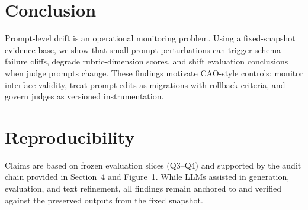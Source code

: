 \documentclass{article}
\begin{document}
\section{Conclusion}
Prompt-level drift is an operational monitoring problem.
Using a fixed-snapshot evidence base, we show that small prompt perturbations can trigger schema failure cliffs, degrade rubric-dimension scores, and shift evaluation conclusions when judge prompts change.
These findings motivate CAO-style controls: monitor interface validity, treat prompt edits as migrations with rollback criteria, and govern judges as versioned instrumentation.

\section*{Reproducibility}\vspace{-2pt}
Claims are based on frozen evaluation slices (Q3--Q4) and supported by the audit chain provided in Section~4 and Figure~1. 
While LLMs assisted in generation, evaluation, and text refinement, all findings remain anchored to and verified against the preserved outputs from the fixed snapshot.

\clearpage
\setcounter{page}{9}


\end{document}
